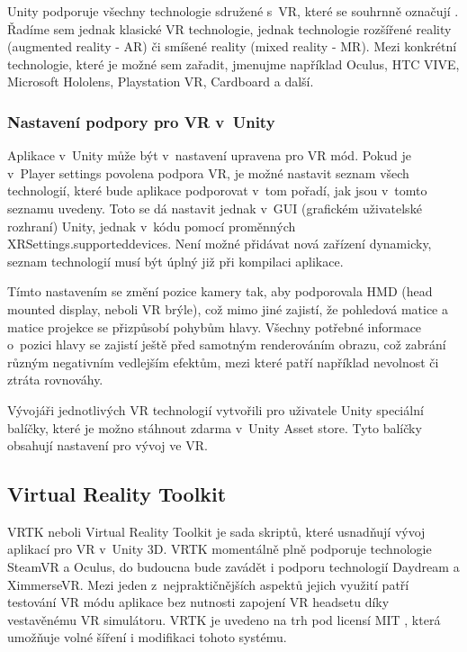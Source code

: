 \documentclass[thesis=B,czech]{FITthesis}[2012/06/26]
\begin{document}
		Unity podporuje všechny technologie sdružené s~VR, které se souhrnně označují . Řadíme sem jednak klasické VR technologie, jednak technologie rozšířené reality (augmented reality - AR) či smíšené reality (mixed reality - MR). Mezi konkrétní technologie, které je možné sem zařadit, jmenujme například Oculus, HTC VIVE, Microsoft Hololens, Playstation VR, Cardboard a další.\cite{UnityVR}
		
		\subsubsection{Nastavení podpory pro VR v~Unity}
		
		Aplikace v~Unity může být v~nastavení upravena pro VR mód. Pokud je v~Player settings povolena podpora VR, je možné nastavit seznam všech technologií, které bude aplikace podporovat v~tom pořadí, jak jsou v~tomto seznamu uvedeny. Toto se dá nastavit jednak v~GUI (grafickém uživatelské rozhraní) Unity, jednak v~kódu pomocí proměnných XRSettings.supporteddevices. Není možné přidávat nová zařízení dynamicky, seznam technologií musí být úplný již při kompilaci aplikace.

Tímto nastavením se změní pozice kamery tak, aby podporovala HMD (head mounted display, neboli VR brýle), což mimo jiné zajistí, že pohledová matice a matice projekce se přizpůsobí pohybům hlavy. Všechny potřebné informace o~pozici hlavy se zajistí ještě před samotným renderováním obrazu, což zabrání různým negativním vedlejším efektům, mezi které patří například nevolnost či ztráta rovnováhy.

Vývojáři jednotlivých VR technologií vytvořili pro uživatele Unity speciální balíčky, které je možno stáhnout zdarma v~Unity Asset store. Tyto balíčky obsahují nastavení pro vývoj ve VR.\cite{UnityVR}

		\subsection{Virtual Reality Toolkit}
		
		VRTK neboli Virtual Reality Toolkit je sada skriptů, které usnadňují vývoj aplikací pro VR v~Unity 3D. VRTK momentálně plně podporuje technologie SteamVR a Oculus, do budoucna bude zavádět i podporu technologií Daydream a XimmerseVR. Mezi jeden z~nejpraktičnějších aspektů jejich využití patří testování VR módu aplikace bez nutnosti zapojení VR headsetu díky vestavěnému VR simulátoru. VRTK je uvedeno na trh pod licensí MIT \cite{VRTKlic}, která umožňuje volné šíření i modifikaci tohoto systému.
		
\end{document}
